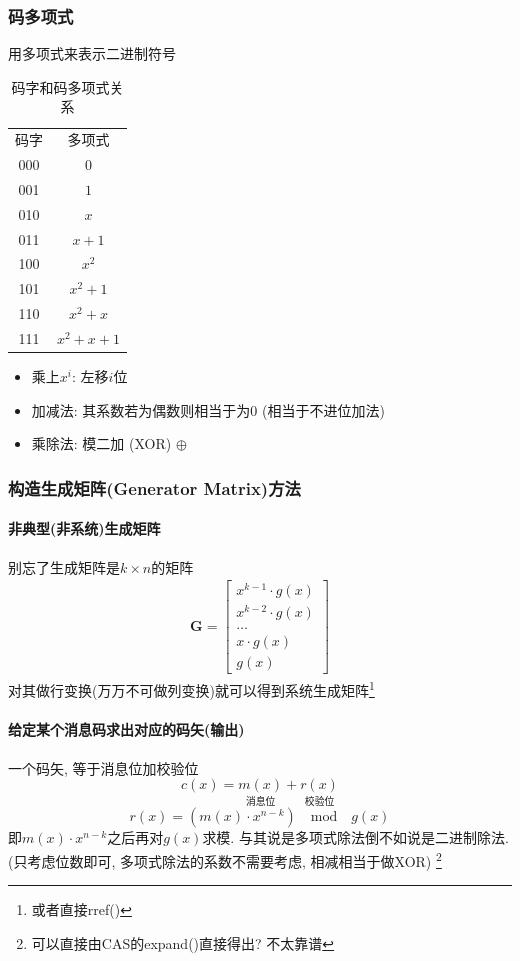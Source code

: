 \documentclass[a4paper]{report}
\begin{document}
\subsubsection{码多项式}
用多项式来表示二进制符号
\begin{table}[H]
  \centering
  \caption{码字和码多项式关系}
    \begin{tabular}{cc}
    码字    & 多项式 \\
    000   & $0$ \\
    001   & $1$ \\
    010   & $x$ \\
    011   & $x+1$ \\
    100   & $x^2$ \\
    101   & $x^2+1$ \\
    110   & $x^2+x$ \\
    111   & $x^2+x+1$ \\
    \end{tabular}
\end{table}

\begin{itemize}
  \item 乘上$x^i$: 左移$i$位
  \item 加减法: 其系数若为偶数则相当于为0 (相当于不进位加法)
  \item 乘除法: 模二加 (XOR) $\oplus$
\end{itemize}


\subsubsection{构造生成矩阵(Generator Matrix)方法}
\paragraph{非典型(非系统)生成矩阵}
别忘了生成矩阵是$k\times n$的矩阵
\begin{gather}
  \textbf{G}=
  \begin{bmatrix}
    x^{k-1}\cdot g(x)
    \\x^{k-2}\cdot g(x)
    \\ \dots
    \\ x\cdot g(x)
    \\ g(x)
  \end{bmatrix}
\end{gather}
对其做行变换(万万不可做列变换)就可以得到系统生成矩阵\footnote{或者直接rref()}
\paragraph{给定某个消息码求出对应的码矢(输出)}
一个码矢, 等于消息位加校验位
$$c(x)=\underset{\text{消息位}}{m(x)}+\underset{\text{校验位}}{r(x)} $$
$$r(x)=(m(x)\cdot x^{n-k})\quad  \text{mod} \quad g(x)$$
即$m(x)\cdot x^{n-k}$之后再对$g(x)$求模. 与其说是多项式除法倒不如说是二进制除法. (只考虑位数即可, 多项式除法的系数不需要考虑, 相减相当于做XOR) \footnote{可以直接由CAS的expand()直接得出? 不太靠谱}
\end{document}
